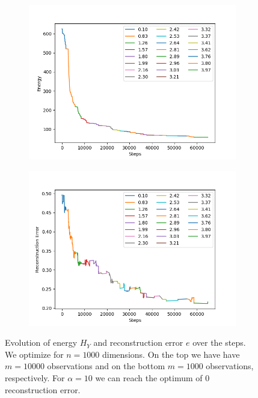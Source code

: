 \documentclass{scrartcl}
\begin{document}
\begin{figure}[h]
\begin{subfigure}{0.49\textwidth}
        \includegraphics[width=\textwidth]{plot_energy_1000_1000.png}
    \end{subfigure}
    \begin{subfigure}{0.49\textwidth}
        \includegraphics[width=\textwidth]{plot_error_1000_1000.png}
    \end{subfigure}
    \caption{Evolution of energy $H_Y$ and reconstruction error $e$ over the steps. We optimize for $n=1000$ dimensions. On the top we have have $m=10000$ observations and on the bottom $m=1000$ observations, respectively. For $\alpha=10$ we can reach the optimum of $0$ reconstruction error.}
    \label{fig:evolution}
\end{figure}
\end{document}
